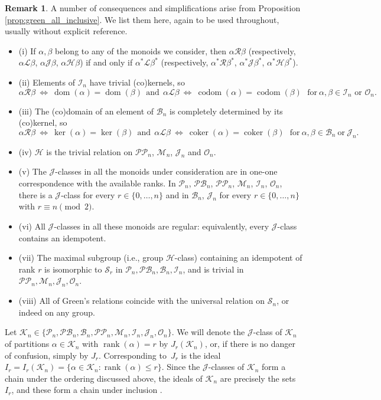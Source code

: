 \documentclass[11pt,a4paper]{article}
\newcommand{\PP}{\mathscr{P}\P}
\newcommand{\M}{\mathcal M}
\renewcommand{\O}{\mathcal O}
\newcommand{\I}{\mathcal I}
\renewcommand{\S}{\mathcal S}
\newcommand{\B}{\mathcal B}
\renewcommand{\P}{\mathcal P}
\newcommand{\PB}{\mathcal{PB}}
\newcommand{\J}{\mathcal J}
\renewcommand{\H}{\mathrel{\mathscr H}}
\renewcommand{\L}{\mathrel{\mathscr L}}
\newcommand{\R}{\mathrel{\mathscr R}}
\newcommand{\gJ}{\mathrel{\mathscr J}}
\newcommand{\al}{\alpha}
\newcommand{\be}{\beta}
\newcommand{\coker}{\operatorname{coker}}
\newcommand{\dom}{\operatorname{dom}}
\newcommand{\codom}{\operatorname{codom}}
\newcommand{\rank}{\operatorname{rank}}
\newcommand{\set}[2]{\{ {#1} : {#2} \}}
\newcommand{\1}{\id_n}
\renewcommand{\iff}{\ \Leftrightarrow\ }
\newcommand{\bit}{\begin{itemize}}
\newcommand{\eit}{\end{itemize}}
\numberwithin{equation}{section}
\theoremstyle{definition}
\newtheorem{rem}[equation]{Remark}
\begin{document}
\begin{rem}\label{rem:green_sumbonoids}
A number of consequences and simplifications arise 
from Proposition \ref{prop:green_all_inclusive}.  
We list them here, again to be used throughout, usually without explicit reference.
\bit 
\item[(i)]    \label{rem:gs:item1}
If $\al,\be$ belong to any of the monoids we consider, then $\alpha\R\beta$ (respectively, $\alpha\L\beta$, $\alpha\gJ\beta$, $\alpha\H\beta$)
if and only if $\alpha^\ast\L\beta^\ast$ (respectively, $\alpha^\ast\R\beta^\ast$, $\alpha^\ast\gJ\beta^\ast$, $\alpha^\ast\H\beta^\ast$).
\item[(ii)] \label{rem:gs:item2}
Elements of $\I_n$ have trivial (co)kernels, so
\[
\al\R\be \iff \dom(\al)=\dom(\be)\ \  
\text{and}\ \  
\al\L\be \iff \codom(\al)=\codom(\be) 
\ \ \ \text{for} \  \al,\be\in\I_n \text{ or } \O_n.
\]
\item[(iii)] \label{rem:gs:item3}
The (co)domain of an element of $\B_n$ is completely determined by its (co)kernel, so
\[
\al\R\be \iff \ker(\al)=\ker(\be) \ \ 
\text{and}\ \ 
 \al\L\be \iff \coker(\al)=\coker(\be)\ \ \ 
 \text{for}\  \al,\be\in\B_n \  \text{or}\ \J_n.
\]
\item[(iv)] \label{rem:gs:item4}
$\H$ is the trivial relation on $\PP_n$, $\M_n$, $\J_n$ and $\O_n$.  
\item[(v)] \label{rem:gs:item5}
The $\gJ$-classes in all the monoids under consideration are in one-one
  correspondence with the available ranks. In $\P_n$, $\PB_n$, $\PP_n$, $\M_n$,
  $\I_n$, $\O_n$, there is a $\gJ$-class for every $r\in\{0,\dots,n\}$
  and in $\B_n$, $\J_n$ for every $r\in\{0,\dots,n\}$ with $r\equiv n\pmod{2}$.
\item[(vi)] \label{rem:gs:item6}
All $\gJ$-classes in all these monoids are regular: equivalently, every
  $\gJ$-class contains an idempotent.
\item[(vii)] \label{rem:gs:item7}
The maximal subgroup (i.e., group $\H$-class)  containing an idempotent of rank $r$ is isomorphic to $\S_r$ in
$\P_n,\PB_n,\B_n,\I_n$, and is trivial in $\PP_n,\M_n,\J_n, \O_n$.
\item[(viii)] \label{rem:gs:item8}
All of Green's relations coincide with the universal relation on $\S_n$, or indeed on any group.
\eit
\end{rem}

Let $\mathcal{K}_n\in\{\P_n,\PB_n,\B_n,\PP_n,\M_n,\I_n,\mathcal J_n,\O_n\}$.
We will denote the $\gJ$-class of $\mathcal{K}_n$ of partitions $\alpha\in\mathcal{K}_n$ with $\rank(\alpha)=r$ by $J_r(\mathcal{K}_n)$, or, if there is no danger of confusion, simply by $J_r$.
Corresponding to~$J_r$ is the ideal 
$I_r=I_r(\mathcal{K}_n)=\set{\alpha\in\mathcal{K}_n}{\rank(\alpha)\leq r}$.
Since the $\gJ$-classes of $\mathcal K_n$ form a chain under the ordering discussed above, the ideals of $\mathcal K_n$ are precisely the sets $I_r$, and these form a chain under inclusion \cite[Proposition 2.6]{DEG2017}.
\end{document}
